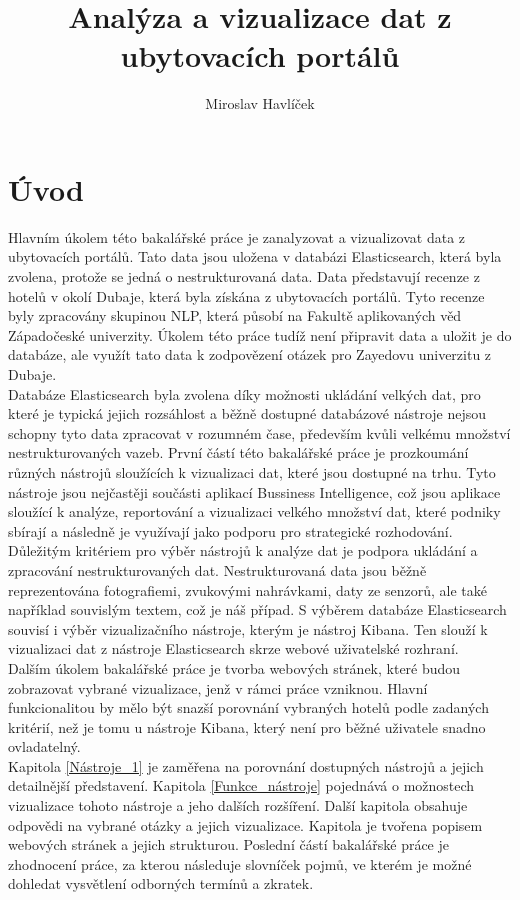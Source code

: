 \documentclass[czech,BP]{thesiskiv}
\author{Miroslav Havlíček}
\title{Analýza a vizualizace dat z ubytovacích portálů}
\begin{document}
%
\maketitle
\tableofcontents
\chapter{Úvod}
Hlavním úkolem této bakalářské práce je zanalyzovat a vizualizovat data z ubytovacích portálů. Tato data jsou uložena v databázi Elasticsearch, která byla zvolena, protože se jedná o nestrukturovaná data. Data představují recenze z hotelů v okolí Dubaje, která byla získána z ubytovacích portálů. Tyto recenze byly zpracovány skupinou NLP, která působí na Fakultě aplikovaných věd Západočeské univerzity. Úkolem této práce tudíž není připravit data a uložit je do databáze, ale využít tato data k zodpovězení otázek pro Zayedovu univerzitu z Dubaje.
\\
Databáze Elasticsearch byla zvolena díky možnosti ukládání velkých dat, pro které je typická jejich rozsáhlost a běžně dostupné databázové nástroje nejsou schopny tyto data zpracovat v rozumném čase, především kvůli velkému množství nestrukturovaných vazeb.\cite{BigData} První částí této bakalářské práce je prozkoumání různých nástrojů sloužících k vizualizaci dat, které jsou dostupné na trhu. Tyto nástroje jsou nejčastěji součásti aplikací Bussiness Intelligence, což jsou aplikace sloužící k analýze, reportování a vizualizaci velkého množství dat, které podniky sbírají a následně je využívají jako podporu pro strategické rozhodování. \\Důležitým kritériem pro výběr nástrojů k analýze dat je podpora ukládání a zpracování nestrukturovaných dat. Nestrukturovaná data jsou běžně reprezentována fotografiemi, zvukovými nahrávkami, daty ze senzorů, ale také například  souvislým textem, což je náš případ. S výběrem databáze Elasticsearch souvisí i výběr vizualizačního nástroje, kterým je nástroj Kibana. Ten slouží k vizualizaci dat z nástroje Elasticsearch skrze webové uživatelské rozhraní.
\\
Dalším úkolem bakalářské práce je tvorba webových stránek, které budou zobrazovat vybrané vizualizace, jenž v rámci práce vzniknou. Hlavní funkcionalitou by mělo být snazší porovnání vybraných hotelů podle zadaných kritérií, než je tomu u nástroje Kibana, který není pro běžné uživatele snadno ovladatelný.
\\
Kapitola \ref{Nástroje_1} je zaměřena na porovnání dostupných nástrojů a jejich detailnější představení. Kapitola \ref{Funkce_nástroje} pojednává o možnostech vizualizace tohoto nástroje a jeho dalších rozšíření. Další kapitola obsahuje odpovědi na vybrané otázky a jejich vizualizace. Kapitola \textbf{} je tvořena popisem webových stránek a jejich strukturou. Poslední částí bakalářské práce je zhodnocení práce, za kterou následuje slovníček pojmů, ve kterém je možné dohledat vysvětlení odborných termínů a zkratek.
\end{document}
